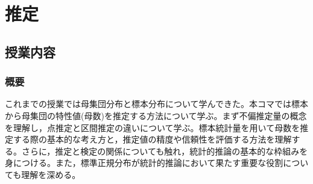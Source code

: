 \section{推定}
\label{b12_test}

\subsection{授業内容}
\subsubsection{概要}
これまでの授業では母集団分布と標本分布について学んできた。本コマでは標本から母集団の特性値(母数)を推定する方法について学ぶ。まず不偏推定量の概念を理解し，点推定と区間推定の違いについて学ぶ。標本統計量を用いて母数を推定する際の基本的な考え方と，推定値の精度や信頼性を評価する方法を理解する。さらに，推定と検定の関係についても触れ，統計的推論の基本的な枠組みを身につける。また，標準正規分布が統計的推論において果たす重要な役割についても理解を深める。

